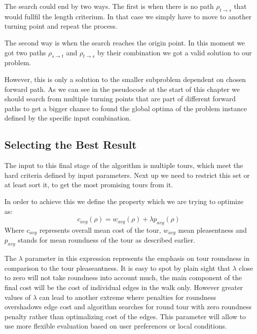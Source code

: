\documentclass{ctuthesis}
\begin{document}
The search could end by two ways. The first is when there is no path \(\rho_{t \rightarrow s}\) that would fullfil the length criterium. In that case we simply have to move to another turning point and repeat the process.\par 
The second way is when the search reaches the origin point. In this moment we got two paths \(\rho_{s \rightarrow t}\) and \(\rho_{t \rightarrow s}\) by their combination we got a valid solution to our problem. \par However, this is only a solution to the smaller subproblem dependent on chosen forward path. As we can see in the pseudocode at the start of this chapter we should search from multiple turning points that are part of different forward paths to get a bigger chance to found the global optima of the problem instance defined by the specific input combination. \par

\subsection{Selecting the Best Result} \label{sec:bestResult}
The input to this final stage of the algorithm is multiple tours, which meet the hard criteria defined by input parameters. Next up we need to restrict this set or at least sort it, to get the most promising tours from it.\par
In order to achieve this we define the property which we are trying to optimize as:
\begin{equation}
c_{avg}(\rho) = w_{avg}(\rho) + \lambda p_{avg}(\rho)
\end{equation}
Where \(c_{avg}\) represents overall mean cost of the tour, \(w_{avg}\) mean pleasentness and \(p_{avg}\) stands for mean roundness of the tour as described earlier. \par 
The \(\lambda\) parameter in this expression represents the emphasis on tour roundness in comparison to the tour pleaseantness. It is easy to spot by plain sight that \(\lambda\) close to zero will not take roundness into account much, the main component of the final cost will be the cost of individual edges in the walk only. However greater values of \(\lambda\) can lead to another extreme where penalties for roundness overshadows edge cost and algorithm searches for round tour with zero roundness penalty rather than optimalizing cost of the edges. This parameter will allow to use more flexible evaluation based on user preferences or local conditions. \par
\end{document}
